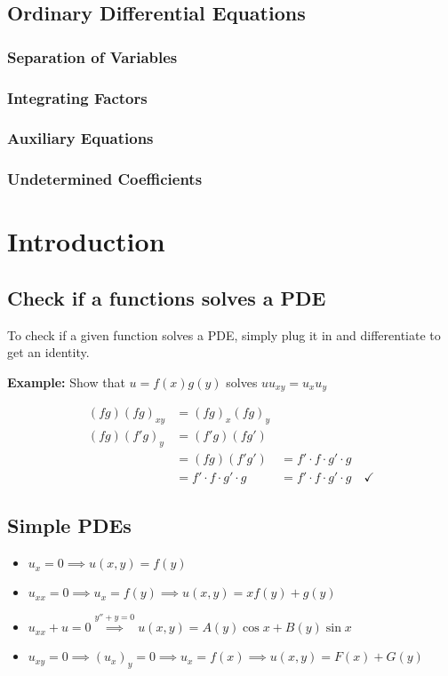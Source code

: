 \documentclass[10pt]{article}
\begin{document}
\subsection{Ordinary Differential Equations}
\subsubsection{Separation of Variables}
\subsubsection{Integrating Factors}
\subsubsection{Auxiliary Equations}
\subsubsection{Undetermined Coefficients}

\section{Introduction}
\subsection{Check if a functions solves a PDE}
To check if a given function solves a PDE, simply plug it in and differentiate to get an identity.

\textbf{Example:} Show that $u = f(x)g(y)$ solves $uu_{xy} = u_xu_y$

\begin{align*}
    (fg)(fg)_{xy} &= (fg)_x(fg)_y\\
    (fg)(f'g)_y &= (f'g)(fg')\\
    &=(fg)(f'g') &= f'\cdot f\cdot g'\cdot g\\
    &= f' \cdot f \cdot g' \cdot g &= f'\cdot f\cdot g'\cdot g\quad \checkmark
\end{align*}

\subsection{Simple PDEs}
\begin{itemize}
    \item $u_x = 0 \implies u(x, y) = f(y)$
    \item $u_{xx} = 0 \implies u_x = f(y) \implies u(x, y) = xf(y) + g(y)$
    \item $u_{xx} + u = 0 \overset{y''+y=0}{\implies} u(x, y) = A(y) \cos x + B(y) \sin x$
    \item $u_{xy} = 0 \implies (u_x)_y = 0 \implies u_x = f(x) \implies u(x, y) = F(x) + G(y)$
\end{itemize}
\end{document}
